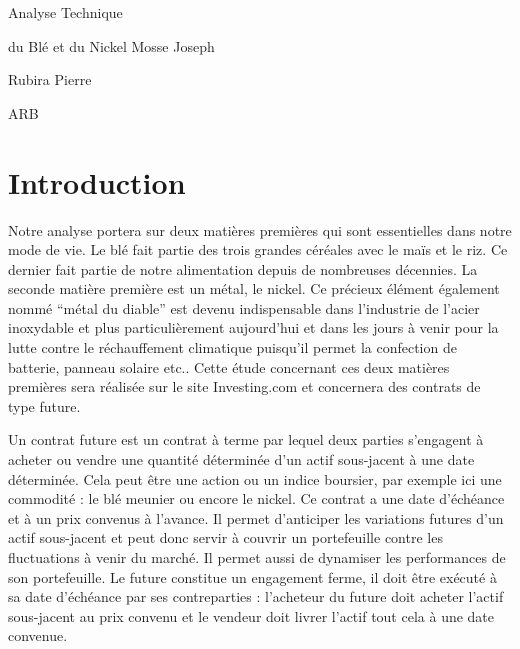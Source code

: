 \documentclass[12pt,a4paper]{article}
\begin{document}

\pagecolor{mytan}\afterpage{\nopagecolor}
\thispagestyle{empty}
\begin{flushright}
\titlefont Analyse Technique\par\vspace{0.1cm}
\titlefont du Blé et du Nickel
\vfill
\namefont Mosse Joseph \par\vspace{0.2cm} Rubira Pierre \par\vspace{0.3cm} ARB
\end{flushright}
\vfill
\begin{center}
\end{center}

\section*{Introduction}
Notre analyse portera sur deux matières premières qui sont essentielles dans notre mode de vie. Le blé fait partie des trois grandes céréales avec le maïs et le riz. Ce 
dernier fait partie de notre alimentation depuis de nombreuses décennies. La seconde matière première est un métal, le nickel. Ce précieux élément également nommé “métal 
du diable” est devenu indispensable dans l'industrie de l'acier inoxydable et plus particulièrement aujourd'hui et dans les jours à venir pour la lutte contre le 
réchauffement climatique puisqu'il permet la confection de batterie, panneau solaire etc..
Cette étude concernant ces deux matières premières sera réalisée sur le site Investing.com et concernera des contrats de type future.

Un contrat future est un contrat à terme par lequel deux parties s'engagent à acheter ou vendre une quantité déterminée d'un actif sous-jacent à une date déterminée. Cela 
peut être une action ou un indice boursier, par exemple ici une commodité : le blé meunier ou encore le nickel. 
Ce contrat a une date d'échéance et à un prix convenus à l'avance. Il permet d'anticiper les variations futures d'un actif sous-jacent et peut donc servir à couvrir un 
portefeuille contre les fluctuations à venir du marché. Il permet aussi de dynamiser les performances de son portefeuille. Le future constitue un engagement ferme, il doit 
être exécuté à sa date d'échéance par ses contreparties : l'acheteur du future doit acheter l'actif sous-jacent au prix convenu et le vendeur doit livrer l'actif tout cela 
à une date convenue.
\end{document}
